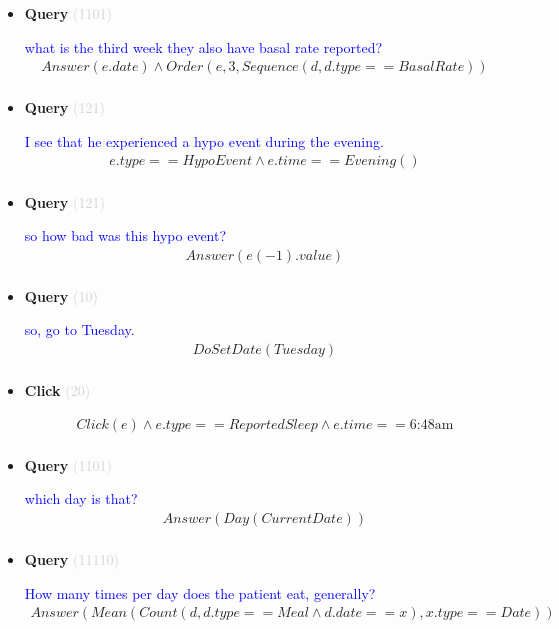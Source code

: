 \documentclass[11pt]{article}
\newcommand{\key}[1]{\textcolor{lightgray}{#1}}
\newcounter{CQuery}
\newcounter{CClick}
\begin{document}
\begin{itemize}
\item
\textbf{Query\theCQuery} \key{(1101)} \addtocounter{CQuery}{1}
\textcolor{blue}{ what is the third week they also have basal rate reported? }
\begin{multline*}
Answer(e.date) \wedge Order(e, 3, Sequence(d, d.type==BasalRate)) \\ 
\end{multline*}


\item
\textbf{Query\theCQuery} \key{(121)} \addtocounter{CQuery}{1}
\textcolor{blue}{ I see that he experienced a hypo event during the evening. }
\begin{multline*}
e.type==HypoEvent \wedge e.time==Evening() \\ 
\end{multline*}


\item
\textbf{Query\theCQuery} \key{(121)} \addtocounter{CQuery}{1}
\textcolor{blue}{ so how bad was this hypo event? }
\begin{multline*}
Answer(e(-1).value) \\ 
\end{multline*}


\item
\textbf{Query\theCQuery} \key{(10)} \addtocounter{CQuery}{1}
\textcolor{blue}{ so, go to Tuesday. }
\begin{multline*}
DoSetDate(Tuesday) \\ 
\end{multline*}


\item
\textbf{Click\theCClick} \key{(20)} \addtocounter{CClick}{1}
\textcolor{blue}{  }
\begin{multline*}
Click(e) \wedge e.type==ReportedSleep \wedge e.time==\mbox{6:48am} \\ 
\end{multline*}


\item
\textbf{Query\theCQuery} \key{(1101)} \addtocounter{CQuery}{1}
\textcolor{blue}{ which day is that? }
\begin{multline*}
Answer(Day(CurrentDate)) \\ 
\end{multline*}


\item
\textbf{Query\theCQuery} \key{(11110)} \addtocounter{CQuery}{1}
\textcolor{blue}{ How many times per day does the patient eat, generally? }
\begin{multline*}
Answer(Mean(Count(d, d.type==Meal \wedge d.date==x), x.type==Date)) \\ 
\end{multline*}



\end{itemize}
\end{document}
